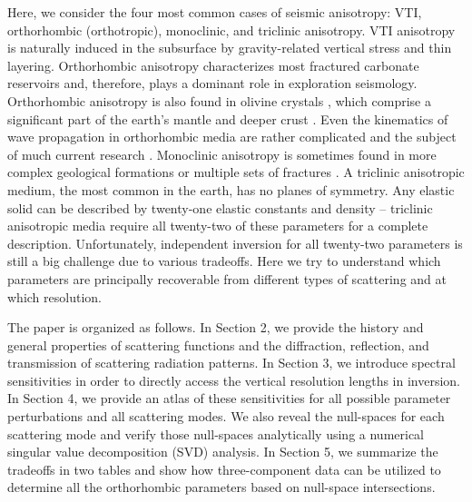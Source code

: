 Here, we consider the four most common cases of seismic anisotropy: VTI, orthorhombic (orthotropic), monoclinic, and triclinic anisotropy. VTI anisotropy is naturally induced in the subsurface by gravity-related vertical stress \citep{thomsen1986} and thin layering. 
Orthorhombic anisotropy characterizes most fractured carbonate reservoirs \citep{schoenberg1997,tsvankin1997} and, therefore, plays a dominant role in exploration seismology. Orthorhombic anisotropy is also found in olivine crystals \citep{durham1977}, which comprise a significant part of the earth's mantle and deeper crust \citep[e.g.][]{tommasi2009}. Even the kinematics of wave propagation in orthorhombic media are rather complicated and the subject of much current research \citep{stovas2015,stovas2017,ivanov2016,xu2018}. Monoclinic anisotropy is sometimes found in more complex geological formations or multiple sets of fractures \citep{grechka2000}. A triclinic anisotropic medium, the most common in the earth, has no planes of symmetry. Any elastic solid can be described by twenty-one elastic constants and density -- triclinic anisotropic media require all twenty-two of these parameters for a complete description. Unfortunately, independent inversion for all twenty-two parameters is still a big challenge \citep{kohn2015} due to various tradeoffs. Here we try to understand which parameters are principally recoverable from different types of scattering and at which resolution.

The paper is organized as follows. 
In Section 2, we provide the history and general properties of scattering functions and the diffraction, reflection, and transmission of scattering radiation patterns. In Section 3, we introduce spectral sensitivities in order to directly access the vertical resolution lengths in inversion. In Section 4, we provide an atlas of these sensitivities for all possible parameter perturbations and all scattering modes. We also reveal the null-spaces for each scattering mode and verify those null-spaces analytically using a numerical singular value decomposition (SVD) analysis. In Section 5, we summarize the tradeoffs in two tables and show how three-component data can be utilized to determine all the orthorhombic parameters based on null-space intersections.










